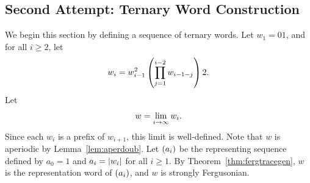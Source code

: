 \documentclass[english,12pt]{article}
\newcommand{\seq}{\p}
\begin{document}
\subsection{Second Attempt: Ternary Word Construction}\label{ss:ternary}
We begin this section by defining a sequence of ternary words.  Let $w_1=01$, and for all $i\geq2$, let
\[
w_i=w_{i-1}^2\left(\prod_{j=1}^{i-2}w_{i-1-j}\right)2.
\]
Let
\[
w=\lim_{i\rightarrow\infty}{w_i}.
\]
Since each $w_i$ is a prefix of $w_{i+1}$, this limit is well-defined.  Note that $w$ is aperiodic by Lemma~\ref{lem:aperdoub}.  Let $\seq{a_i}$ be the representing sequence defined by $a_0=1$ and $a_i=\left|w_i\right|$ for all $i\geq1$.  By Theorem~\ref{thm:fergtracegen}, $w$ is the representation word of $\seq{a_i}$, and $w$ is strongly Fergusonian.
%
%
\end{document}
